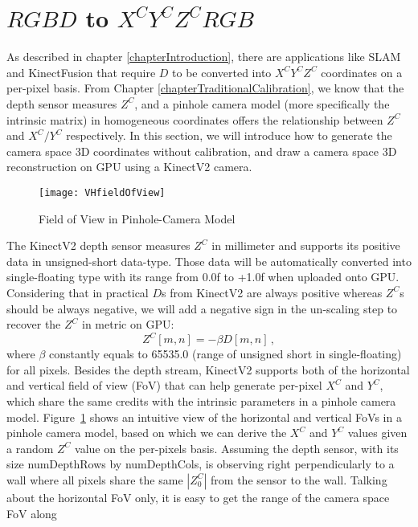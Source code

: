 \section{\(RGBD\) to \(X^CY^CZ^CRGB\)}
\label{sectionCameraSpaceReconstruction}
As described in chapter \ref{chapterIntroduction}, there are applications like SLAM and KinectFusion that require \(D\) to be converted into \(X^CY^CZ^C\) coordinates on a per-pixel basis. From Chapter \ref{chapterTraditionalCalibration}, we know that the depth sensor measures \(Z^C\), and a pinhole camera model (more specifically the intrinsic matrix) in homogeneous coordinates offers the relationship between \(Z^C\) and \(X^C/Y^C\) respectively. In this section, we will introduce how to generate the camera space 3D coordinates without calibration, and draw a camera space 3D reconstruction on GPU using a KinectV2 camera.
\\\indent
%
\begin{figure}[!b]
\centering
\texttt{[image: VHfieldOfView]}
\caption{Field of View in Pinhole-Camera Model}
\label{VHfieldOfView}
\end{figure}%
%
The KinectV2 depth sensor measures \(Z^C\) in millimeter and supports its positive data in unsigned-short data-type. Those data will be automatically converted into single-floating type with its range from 0.0f to +1.0f when uploaded onto GPU. Considering that in practical \(D\)s from KinectV2 are always positive whereas \(Z^C\)s should be always negative, we will add a negative sign in the un-scaling step to recover the \(Z^C\) in metric on GPU:
\begin{equation}
Z^C[m, n] = - \beta D[m, n] \, ,
\label{unscalingZc}
\end{equation}%
\noindent
where \(\beta\) constantly equals to 65535.0 (range of unsigned short in single-floating) for all pixels. Besides the depth stream, KinectV2 supports both of the horizontal and vertical field of view (FoV) that can help generate per-pixel \(X^C\) and \(Y^C\), which share the same credits with the intrinsic parameters in a pinhole camera model. Figure~\ref{VHfieldOfView} shows an intuitive view of the horizontal and vertical FoVs in a pinhole camera model, based on which we can derive the \(X^C\) and \(Y^C\) values given a random \(Z^C\) value on the per-pixels basis. Assuming the depth sensor, with its size numDepthRows by numDepthCols, is observing right perpendicularly to a wall where all pixels share the same \(|Z^C_0|\) from the sensor to the wall. Talking about the horizontal FoV only, it is easy to get the range of the camera space FoV along 
